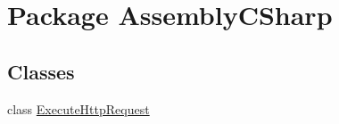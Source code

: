 \hypertarget{namespace_assembly_c_sharp}{\section{Package Assembly\+C\+Sharp}
\label{namespace_assembly_c_sharp}
}
\subsection*{Classes}
\begin{DoxyCompactItemize}
\item 
class \hyperlink{class_assembly_c_sharp_1_1_execute_http_request}{Execute\+Http\+Request}
\end{DoxyCompactItemize}
